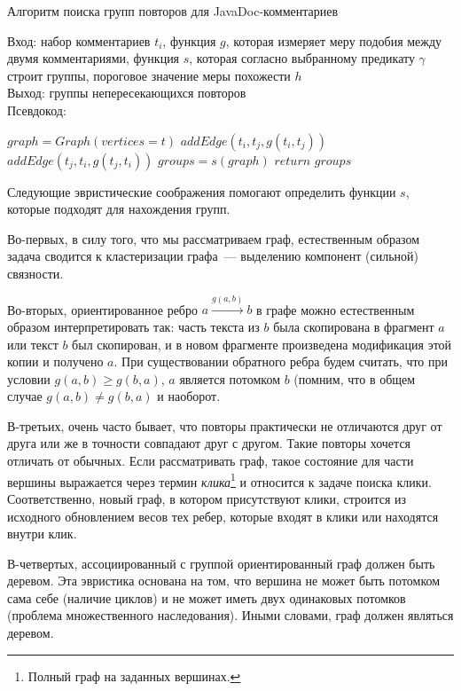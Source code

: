 \begin{algorithm}[t!]
\caption{Алгоритм поиска групп повторов для JavaDoc-комментариев}\label{alg:groupDuplicate}
Вход: набор комментариев $t_{i}$, функция $g$, которая измеряет меру подобия между двумя комментариями, функция $s$, которая согласно выбранному предикату $\gamma$ строит группы, пороговое значение меры похожести $h$\\
Выход: группы непересекающихся повторов\\
Псевдокод:
\begin{algorithmic}[1]
\State $graph = Graph(vertices=t)$
\State $addEdge(t_{i},t_{j},g(t_{i},t_{j}))$
\EndIf
{}
\State $addEdge(t_{j},t_{i},g(t_{j},t_{i}))$
\EndIf
\EndFor
\EndFor
\State $groups = s(graph)$
\State $return$ $groups$
\end{algorithmic}
\end{algorithm}


Следующие эвристические соображения помогают определить функции $s$, которые подходят для нахождения групп.

Во-первых, в силу того, что мы рассматриваем граф, естественным образом задача сводится к кластеризации графа~--- выделению компонент (сильной) связности.

Во-вторых, ориентированное ребро $a \xrightarrow{g(a,b)} b$ в графе можно естественным образом интерпретировать так: часть текста из $b$ была скопирована в фрагмент $a$ или текст $b$ был скопирован, и в новом фрагменте произведена модификация этой копии и получено $a$.
При существовании обратного ребра будем считать, что при условии $g(a,b)\geq g(b,a)$, $a$ является потомком $b$ (помним, что в общем случае $g(a,b)\neq g(b,a)$ и наоборот.

В-третьих, очень часто бывает, что повторы практически не отличаются друг от друга или же в точности совпадают друг с другом.
Такие повторы хочется отличать от обычных.
Если рассматривать граф, такое состояние для части вершины выражается через термин \emph{клика}\footnote{Полный граф на заданных вершинах.} и относится к задаче поиска клики.
Соответственно, новый граф, в котором присутствуют клики, строится из исходного обновлением весов тех ребер, которые входят в клики или находятся внутри клик.

В-четвертых, ассоциированный с группой ориентированный граф должен быть деревом.
Эта эвристика основана на том, что вершина не может быть потомком сама себе (наличие циклов) и не может иметь двух одинаковых потомков (проблема множественного наследования).
Иными словами, граф должен являться деревом.

